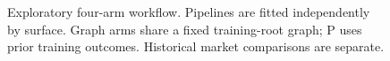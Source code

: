 \begin{figure}[!t]
\centering

\caption{Exploratory four-arm workflow. Pipelines are fitted independently by surface. Graph arms share a fixed training-root graph; P uses prior training outcomes. Historical market comparisons are separate.}
\label{fig:study_workflow}
\end{figure}
